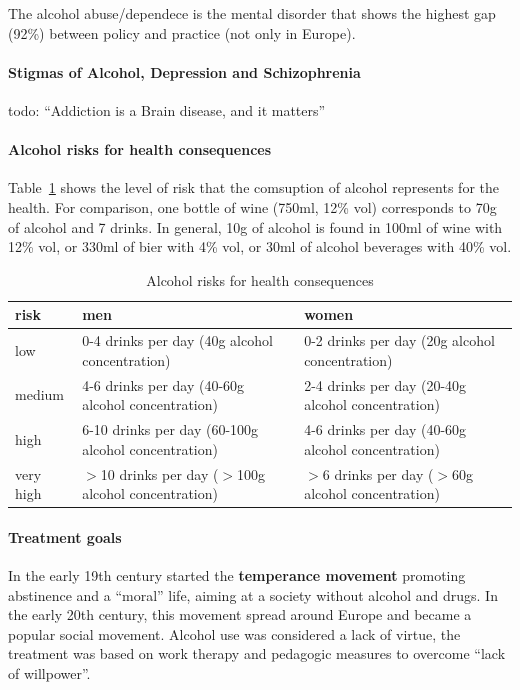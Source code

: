 \documentclass[12pt,article,oneside,a4paper]{memoir}
\begin{document}
The alcohol abuse/dependece is the mental disorder that shows the highest gap
(92\%) between policy and practice (not only in Europe).

\paragraph{Stigmas of Alcohol, Depression and Schizophrenia}
todo: ``Addiction is a Brain disease, and it matters''

\paragraph{Alcohol risks for health consequences}

Table~\ref{table:alcohol-risks} shows the level of risk that the comsuption of
alcohol represents for the health. For comparison, one bottle of wine (750ml,
12\% vol) corresponds to 70g of alcohol and 7 drinks. In general, 10g of
alcohol is found in 100ml of wine with 12\% vol, or 330ml of bier with 4\% vol,
or 30ml of alcohol beverages with 40\% vol.

\begin{table}
  \begin{tabular}{ p{4cm} | p{5cm} | p{5cm} }
    \hline
    risk & men & women \\ \hline
	\hline
    low & 0-4 drinks per day (40g alcohol concentration) & 0-2 drinks per day
    (20g alcohol concentration) \\ \hline
    medium & 4-6 drinks per day (40-60g alcohol concentration) & 2-4 drinks per
    day (20-40g alcohol concentration) \\ \hline
    high & 6-10 drinks per day (60-100g alcohol concentration) & 4-6 drinks per
    day (40-60g alcohol concentration) \\ \hline
    very high & $>$10 drinks per day ($>$100g alcohol concentration) & $>$6
    drinks per day ($>$60g alcohol concentration) \\ 
    \hline
  \end{tabular}
  \caption{Alcohol risks for health consequences}
  \label{table:alcohol-risks}
\end{table}

\paragraph{Treatment goals}
In the early 19th century started the \textbf{temperance movement} promoting
abstinence and a ``moral'' life, aiming at a society without alcohol and drugs.
In the early 20th century, this movement spread around Europe and became a
popular social movement. Alcohol use was considered a lack of virtue, the
treatment was based on work therapy and pedagogic measures to overcome ``lack
of willpower''.
\end{document}
